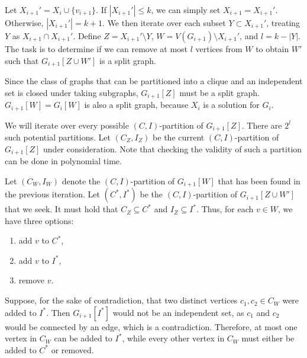 \documentclass[12pt]{article}
\begin{document}
	\medskip
	
	Let \(X_{i + 1}' = X_{i} \cup \{v_{i + 1}\}\). If \(|X_{i + 1}'| \leqslant
	k\), we can simply set \(X_{i + 1} = X_{i + 1}'\). Otherwise, \(|X_{i + 1}'|
	= k + 1\). We then iterate over each subset \(Y \subset X_{i + 1}'\),
	treating \(Y\) as \(X_{i + 1} \cap X_{i + 1}'\). Define \(Z = X_{i + 1}'
	\setminus Y\), \(W = V(G_{i + 1}) \setminus X_{i + 1}'\), and \(l = k -
	|Y|\). The task is to determine if we can remove at most \(l\) vertices from
	\(W\) to obtain \(W'\) such that \(G_{i + 1}[Z \cup W']\) is a split graph.
	
	\medskip
	
	Since the class of graphs that can be partitioned into a clique and an
	independent set is closed under taking subgraphs, \(G_{i + 1}[Z]\) must be a
	split graph. \(G_{i + 1}[W] = G_{i}[W]\) is also a split graph, because
	\(X_{i}\) is a solution for \(G_{i}\).
	
	\medskip
	
	We will iterate over every possible \((C, I)\)-partition of
	\(G_{i + 1}[Z]\). There are \(2^l\) such potential partitions. Let \((C_{Z},
	I_{Z})\) be the current \((C, I)\)-partition of \(G_{i + 1}[Z]\) under
	consideration. Note that checking the validity of such a partition can be
	done in polynomial time.
	
	\medskip
	
	Let \((C_{W}, I_{W})\) denote the \((C, I)\)-partition of \(G_{i + 1}[W]\)
	that has been found in the previous iteration. Let \((C^{\ast}, I^{\ast})\)
	be the \((C, I)\)-partition of \(G_{i + 1}[Z \cup W']\) that we seek. It
	must hold that \(C_{Z} \subseteq C^{\ast}\) and \(I_{Z} \subseteq
	I^{\ast}\). Thus, for each \(v \in W\), we have three options:
	\begin{enumerate}
		\item add \(v\) to \(C^{\ast}\),
		\item add \(v\) to \(I^{\ast}\),
		\item remove \(v\).
	\end{enumerate}
	
	Suppose, for the sake of contradiction, that two distinct vertices \(c_{1},
	c_{2} \in C_{W}\) were added to \(I^{\ast}\). Then \(G_{i + 1}[I^{\ast}]\)
	would not be an independent set, as \(c_{1}\) and \(c_{2}\) would be
	connected by an edge, which is a contradiction. Therefore, at most one
	vertex in \(C_{W}\) can be added to \(I^{\ast}\), while every other vertex
	in \(C_{W}\) must either be added to \(C^{\ast}\) or removed.
	
\end{document}
